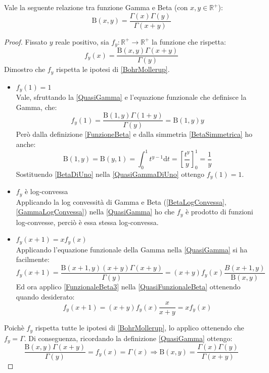 \begin{theorem}\label{GammaBeta}
	Vale la seguente relazione tra funzione Gamma e Beta (con $x,y\in\mathbb{R}^+$):
	\begin{equation*}
		\mathrm{B}(x,y)=\frac{\Gamma(x)\Gamma(y)}{\Gamma(x+y)}
	\end{equation*}
\end{theorem}
\begin{proof}
	Fissato $y$ reale positivo, sia $f_y:\mathbb{R^+}\to\mathbb{R^+}$ la funzione che rispetta:
	\begin{equation}\label{QuasiGamma}
		f_y(x)=\frac{\mathrm{B}(x,y)\Gamma(x+y)}{\Gamma(y)}
	\end{equation}
	Dimostro che $f_y$ rispetta le ipotesi di \ref{BohrMollerup}.
	\begin{itemize}
		\item $f_y(1)=1$\\
			Vale, sfruttando la \eqref{QuasiGamma} e l'equazione funzionale che definisce la Gamma, che:
			\begin{equation}\label{QuasiGammaDiUno}
				f_y(1)=\frac{\mathrm{B}(1,y)\Gamma(1+y)}{\Gamma(y)}=\mathrm{B}(1,y)y
			\end{equation}
			Però dalla definizione \ref{FunzioneBeta} e dalla simmetria \ref{BetaSimmetrica} ho anche:
			\begin{equation}\label{BetaDiUno}
				\mathrm{B}(1,y)=\mathrm{B}(y,1)=\int_0^1 t^{y-1} \mathrm{d}t = \left[\frac{t^y}y\right]_0^1= \frac1y
			\end{equation}
			Sostituendo \eqref{BetaDiUno} nella \eqref{QuasiGammaDiUno} ottengo $f_y(1)=1$.
		\item $f_y$ è log-convessa\\
			Applicando la log convessità di Gamma e Beta (\ref{BetaLogConvessa}, \ref{GammaLogConvessa}) nella \ref{QuasiGamma} ho che $f_y$ è prodotto di 
			funzioni log-convesse, perciò è essa stessa log-convessa.
		\item $f_y(x+1)=xf_y(x)$\\
			Applicando l'equazione funzionale della Gamma nella \ref{QuasiGamma} si ha facilmente:
			\begin{equation}\label{QuasiFunzionaleBeta}
				f_y(x+1)=\frac{\mathrm{B}(x+1,y)(x+y)\Gamma(x+y)}{\Gamma(y)}=(x+y) f_y(x) \frac{B(x+1,y)}{\mathrm{B}(x,y)}
			\end{equation}
			Ed ora applico \ref{FunzionaleBeta3} nella \eqref{QuasiFunzionaleBeta} ottenendo quando desiderato:
			\begin{equation*}
				f_y(x+1)=(x+y) f_y(x) \frac{x}{x+y}=xf_y(x)
			\end{equation*}
	\end{itemize}
	Poichè $f_y$ rispetta tutte le ipotesi di \ref{BohrMollerup}, lo applico ottenendo che $f_y=\Gamma$.
	Di conseguenza, ricordando la definizione \eqref{QuasiGamma} ottengo:
	\begin{equation*}
		\frac{\mathrm{B}(x,y)\Gamma(x+y)}{\Gamma(y)}=f_y(x)=\Gamma(x) \Longrightarrow \mathrm{B}(x,y)=\frac{\Gamma(x)\Gamma(y)}{\Gamma(x+y)}
	\end{equation*}

\end{proof}

